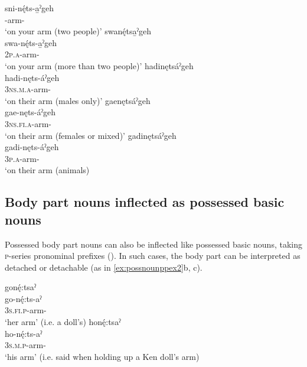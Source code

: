 \gll sni-nę́ts-a̱ˀgeh\\
 -arm-{\on}\\
\glt `on your arm (two people)'
\ex swanę́tsa̱ˀgeh\\
\gll swa-nę́ts-a̱ˀgeh\\
 \textsc{2p.a}-arm-{\on}\\
\glt `on your arm (more than two people)'
\ex hadinętsáˀgeh\\
\gll hadi-nęts-áˀgeh\\
 \textsc{3ns.m.a}-arm-{\on}\\
\glt `on their arm (males only)'
\ex gaenętsáˀgeh\\
\gll gae-nęts-áˀgeh\\
 \textsc{3ns.fi.a}-arm-{\on}\\
\glt `on their arm (females or mixed)'
\ex gadinętsáˀgeh \\
\gll gadi-nęts-áˀgeh \\
\textsc{3p.a}-arm-{\on}\\
\glt ‘on their arm (animals) 
\z
\z

\subsection{Body part nouns inflected as possessed basic nouns} \label{ch:Body part nouns inflected as possessed basic nouns}
Possessed body part nouns can also be inflected like possessed basic nouns, taking \textsc{p}-series pronominal prefixes (). In such cases, the body part can be interpreted as detached or detachable (as in \ref{ex:possnounppex2}b, c).

\ea\label{ex:possnounppex2}
\ea gonę́:tsaˀ\\
\gll go-nę́:ts-aˀ\\
\textsc{3s.fi.p}-arm-{\nounstemformer}\\
\glt ‘her arm’ (i.e. a doll’s)
\ex honę́:tsaˀ\\
\gll ho-nę́:ts-aˀ\\
\textsc{3s.m.p}-arm-{\nounstemformer}\\
\glt ‘his arm’ (i.e. said when holding up a Ken doll’s arm)
\z
\z
